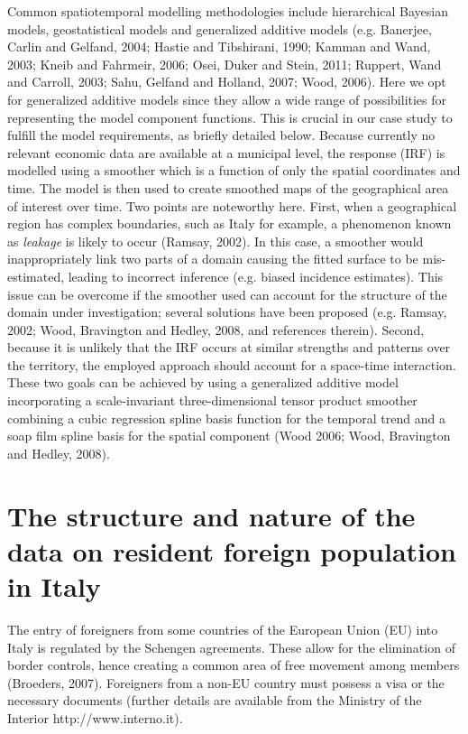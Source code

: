 Common spatiotemporal modelling methodologies include hierarchical Bayesian models, geostatistical models and generalized additive models (e.g. Banerjee, Carlin and Gelfand, 2004; Hastie and Tibshirani, 1990; Kamman and Wand, 2003; Kneib and Fahrmeir, 2006; Osei, Duker and Stein, 2011; Ruppert, Wand and Carroll, 2003; Sahu, Gelfand and Holland, 2007; Wood, 2006). Here we opt for generalized additive models since they allow a wide range of possibilities for representing the model component functions. This is crucial in our case study to fulfill the model requirements, as briefly detailed below. Because currently no relevant economic data are available at a municipal level, the response (IRF) is modelled using a smoother which is a function of only the spatial coordinates and time. The model is then used to create smoothed maps of the geographical area of interest over time. Two points are noteworthy here. First, when a geographical region has complex boundaries, such as Italy for example, a phenomenon known as \textit{leakage} is likely to occur (Ramsay, 2002). In this case, a smoother would inappropriately link two parts of a domain causing the fitted surface to be mis-estimated, leading to incorrect inference (e.g. biased incidence estimates). This issue can be overcome if the smoother used can account for the structure of the domain under investigation; several solutions have been proposed (e.g. Ramsay, 2002; Wood, Bravington and Hedley, 2008, and references therein). Second, because it is unlikely that the IRF occurs at similar strengths and patterns over the territory, the employed approach should account for a space-time interaction. These two goals can be achieved by using a generalized additive model incorporating a scale-invariant three-dimensional tensor product smoother combining a cubic regression spline basis function for the temporal trend and a soap film spline basis for the spatial component (Wood 2006; Wood, Bravington and Hedley, 2008).


\section{The structure and nature of the data on resident foreign population in Italy\label{SDC}}

The entry of foreigners from some countries of the European Union (EU) into Italy is regulated by the Schengen agreements. These allow for the elimination of border controls, hence creating a common area of free movement among members (Broeders, 2007). Foreigners from a non-EU country must possess a visa or the necessary documents (further details are available from the Ministry of the Interior http://www.interno.it). 
 
